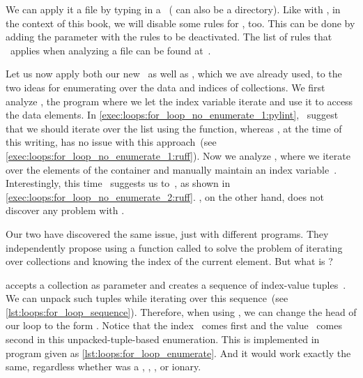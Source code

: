 We can apply it a file  by typing  in a ~( can also be a directory).
Like with \ruff, in the context of this book, we will disable some  rules for \pylint, too.
This can be done by adding the parameter  with the rules to be deactivated.
The list of rules that \pylint\ applies when analyzing a file can be found at~\cite{PC2024PL}.

Let us now apply both our new  \pylint\ as well as \ruff, which we ave already used, to the two ideas for enumerating over the data and indices of collections.
We first analyze , the program where we let the index variable iterate and use it to access the data elements.
In \cref{exec:loops:for_loop_no_enumerate_1:pylint}, \pylint\ suggest that we should iterate over the list  using the  function, whereas \ruff, at the time of this writing, has no issue with this approach~(see \cref{exec:loops:for_loop_no_enumerate_1:ruff}).
Now we analyze , where we iterate over the elements of the container and manually maintain an index variable~.
Interestingly, this time \ruff\ suggests us to~, as shown in \cref{exec:loops:for_loop_no_enumerate_2:ruff}.
\pylint, on the other hand, does not discover any problem with .

Our two  have discovered the same issue, just with different programs.
They independently propose using a function called  to solve the problem of iterating over collections and knowing the index of the current element.
But what is ?

 accepts a collection as parameter and creates a sequence of index-value tuples~\cite{PEP279}.
We can unpack such tuples while iterating over this sequence~(see \cref{lst:loops:for_loop_sequence}).
Therefore, when using , we can change the head of our loop to the form .
Notice that the index~ comes first and the value~ comes second in this unpacked-tuple-based enumeration.
This is implemented in program  given as \cref{lst:loops:for_loop_enumerate}.
And it would work exactly the same, regardless whether  was a , , , or ionary.


